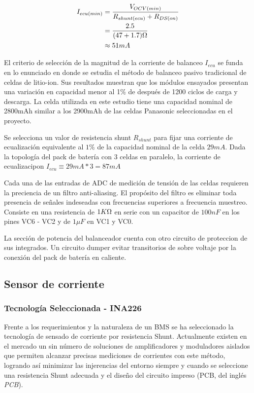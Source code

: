 \documentclass[10pt, a4paper]{article}
\begin{document}
\begin{align}
    I_{ecu (min)} &= \frac{V_{OCV(min)}}{R_{shunt(ecu)}+R_{DS (on)}}\\
    &= \frac{2.5}{(47 + 1.7)\ohm}\\
    &\approx 51mA
\end{align}

El criterio de selección de la magnitud de la corriente de balanceo $I_{ecu}$ se
funda en lo enunciado en \cite{CAMPESTRINI2016142} donde se estudia el método de
balanceo pasivo tradicional de celdas de litio-ion. Sus resultados muestran que
los m\'odulos ensayados presentan una variaci\'on en capacidad menor al 1\% de
despu\'es de 1200 ciclos de carga y descarga. La celda utilizada en este estudio
tiene una capacidad nominal de 2800mAh similar a los 2900mAh de las celdas
Panasonic seleccionadas en el proyecto.

Se selecciona un valor de resistencia shunt $R_{shunt}$ para fijar una corriente
de ecualización equivalente al $1\%$ de la capacidad nominal de la celda $29mA$. 
Dada la topología del pack de batería con 3 celdas en paralelo, la corriente de
ecualizacipon $I_{ecu} \equiv 29mA * 3 = 87 mA$

Cada una de las entradas de ADC de medición de tensión de las celdas requieren
la preciencia de un filtro anti-aliasing. El propósito del filtro es eliminar
toda presencia de señales indeseadas con frecuencias superiores a frecuencia
muestreo. Consiste en una resistencia de $1 K\ohm$ en serie con un capacitor de
$100 nF$ en los pines VC6 - VC2 y de $1 \mu F$ en VC1 y VC0.

La sección de potencia del balanceador cuenta con otro circuito de proteccion de
sus integrados. Un circuito dumper evitar transitorios de sobre voltaje por la
conexión del pack de batería en caliente. 

\newpage

\subsection{Sensor de corriente}

\subsubsection{Tecnología Seleccionada - INA226}\label{seq:ina226_selection}

Frente a los requerimientos y la naturaleza de un \acrshort{BMS} se ha
seleccionado la tecnología de sensado de corriente por resistencia Shunt.
Actualmente existen en el mercado un sin número de soluciones de amplificadores
y moduladores aislados que permiten alcanzar precisas mediciones de corrientes
con este método, logrando as\'i minimizar las injerencias del entorno siempre 
y cuando se seleccione una resistencia Shunt adecuada y el diseño del circuito
impreso (\acrshort{PCB}, del ingl\'es \emph{\acrlong{PCB}}).
\end{document}
